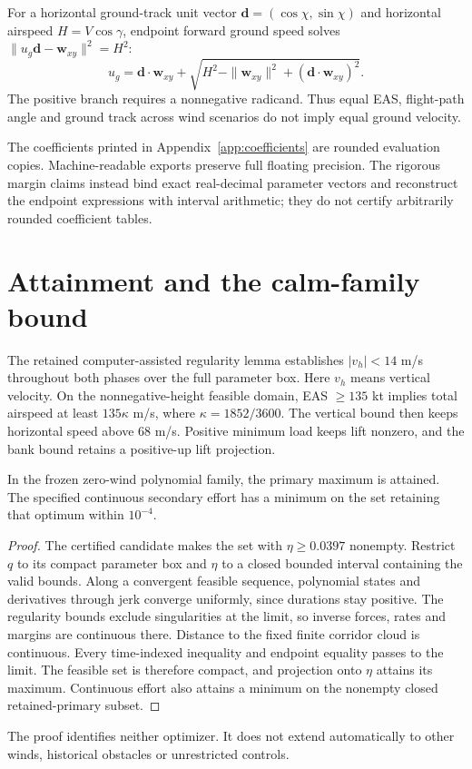 For a horizontal ground-track unit vector $\mathbf d=(\cos\chi,\sin\chi)$ and horizontal airspeed $H=V\cos\gamma$, endpoint forward ground speed solves $\|u_g\mathbf d-\mathbf w_{xy}\|^2=H^2$:
\[
u_g=\mathbf d\cdot\mathbf w_{xy}+\sqrt{H^2-\|\mathbf w_{xy}\|^2+(\mathbf d\cdot\mathbf w_{xy})^2}.
\]
The positive branch requires a nonnegative radicand. Thus equal EAS, flight-path angle and ground track across wind scenarios do not imply equal ground velocity.

The coefficients printed in Appendix~\ref{app:coefficients} are rounded evaluation copies. Machine-readable exports preserve full floating precision. The rigorous margin claims instead bind exact real-decimal parameter vectors and reconstruct the endpoint expressions with interval arithmetic; they do not certify arbitrarily rounded coefficient tables.
\par\medskip
\section{Attainment and the calm-family bound}\label{app:bounds}
The retained computer-assisted regularity lemma establishes $|v_h|<14$ m/s throughout both phases over the full parameter box. Here $v_h$ means vertical velocity. On the nonnegative-height feasible domain, EAS $\geq135$ kt implies total airspeed at least $135\kappa$ m/s, where $\kappa=1852/3600$. The vertical bound then keeps horizontal speed above 68 m/s. Positive minimum load keeps lift nonzero, and the bank bound retains a positive-up lift projection.

\begin{proposition}
In the frozen zero-wind polynomial family, the primary maximum is attained. The specified continuous secondary effort has a minimum on the set retaining that optimum within $10^{-4}$.
\end{proposition}
\begin{proof}
The certified candidate makes the set with $\eta\geq0.0397$ nonempty. Restrict $q$ to its compact parameter box and $\eta$ to a closed bounded interval containing the valid bounds. Along a convergent feasible sequence, polynomial states and derivatives through jerk converge uniformly, since durations stay positive. The regularity bounds exclude singularities at the limit, so inverse forces, rates and margins are continuous there. Distance to the fixed finite corridor cloud is continuous. Every time-indexed inequality and endpoint equality passes to the limit. The feasible set is therefore compact, and projection onto $\eta$ attains its maximum. Continuous effort also attains a minimum on the nonempty closed retained-primary subset.
\end{proof}
The proof identifies neither optimizer. It does not extend automatically to other winds, historical obstacles or unrestricted controls.

